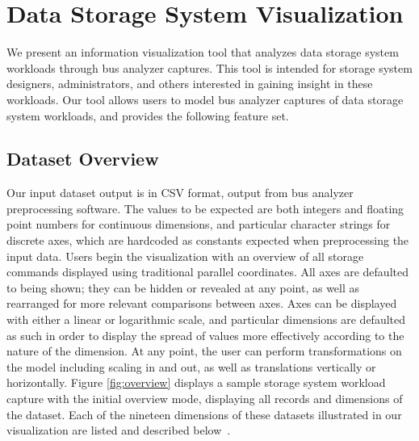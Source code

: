\documentclass[journal]{vgtc}                %
\begin{document}
\section{Data Storage System Visualization}
\label{data-storage-system-visualization}

We present an information visualization tool that analyzes data storage system workloads through bus analyzer captures. This tool is intended for storage system designers, administrators, and others interested in gaining insight in these workloads. Our tool allows users to model bus analyzer captures of data storage system workloads, and provides the following feature set.

\subsection{Dataset Overview}
Our input dataset output is in CSV format, output from bus analyzer preprocessing software. The values to be expected are both integers and floating point numbers for continuous dimensions, and particular character strings for discrete axes, which are hardcoded as constants expected when preprocessing the input data. Users begin the visualization with an overview of all storage commands displayed using traditional parallel coordinates. All axes are defaulted to being shown; they can be hidden or revealed at any point, as well as rearranged for more relevant comparisons between axes. Axes can be displayed with either a linear or logarithmic scale, and particular dimensions are defaulted as such in order to display the spread of values more effectively according to the nature of the dimension. At any point, the user can perform transformations on the model including scaling in and out, as well as translations vertically or horizontally. Figure \ref{fig:overview} displays a sample storage system workload capture with the initial overview mode, displaying all records and dimensions of the dataset. Each of the nineteen dimensions of these datasets illustrated in our visualization are listed and described below~\cite{internal:requirements}.
\end{document}
